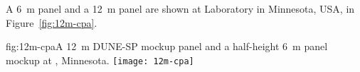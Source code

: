 A \SI{6}{\m}   panel and a \SI{12}{\m}   panel are shown at  Laboratory in Minnesota, USA,  in Figure~\ref{fig:12m-cpa}.


\begin{dunefigure}{fig:12m-cpa}{A \SI{12}{\m} DUNE-SP  mockup panel and a %
half-height \SI{6}{\m}  panel mockup at , Minnesota.}  %
\texttt{[image: 12m-cpa]}
\end{dunefigure}


